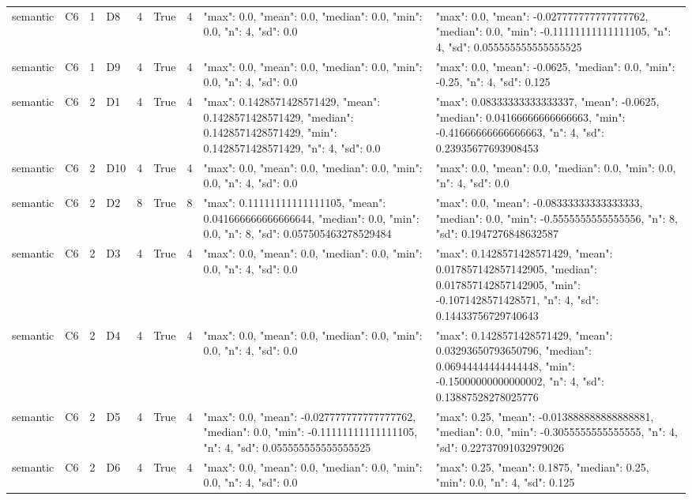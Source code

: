 \begin{tabular}{lllllllll}
semantic & C6 & 1 & D8 & 4 & True & 4 & {"max": 0.0, "mean": 0.0, "median": 0.0, "min": 0.0, "n": 4, "sd": 0.0} & {"max": 0.0, "mean": -0.027777777777777762, "median": 0.0, "min": -0.11111111111111105, "n": 4, "sd": 0.055555555555555525} \\
semantic & C6 & 1 & D9 & 4 & True & 4 & {"max": 0.0, "mean": 0.0, "median": 0.0, "min": 0.0, "n": 4, "sd": 0.0} & {"max": 0.0, "mean": -0.0625, "median": 0.0, "min": -0.25, "n": 4, "sd": 0.125} \\
semantic & C6 & 2 & D1 & 4 & True & 4 & {"max": 0.1428571428571429, "mean": 0.1428571428571429, "median": 0.1428571428571429, "min": 0.1428571428571429, "n": 4, "sd": 0.0} & {"max": 0.08333333333333337, "mean": -0.0625, "median": 0.04166666666666663, "min": -0.41666666666666663, "n": 4, "sd": 0.23935677693908453} \\
semantic & C6 & 2 & D10 & 4 & True & 4 & {"max": 0.0, "mean": 0.0, "median": 0.0, "min": 0.0, "n": 4, "sd": 0.0} & {"max": 0.0, "mean": 0.0, "median": 0.0, "min": 0.0, "n": 4, "sd": 0.0} \\
semantic & C6 & 2 & D2 & 8 & True & 8 & {"max": 0.11111111111111105, "mean": 0.041666666666666644, "median": 0.0, "min": 0.0, "n": 8, "sd": 0.057505463278529484} & {"max": 0.0, "mean": -0.08333333333333333, "median": 0.0, "min": -0.5555555555555556, "n": 8, "sd": 0.1947276848632587} \\
semantic & C6 & 2 & D3 & 4 & True & 4 & {"max": 0.0, "mean": 0.0, "median": 0.0, "min": 0.0, "n": 4, "sd": 0.0} & {"max": 0.1428571428571429, "mean": 0.017857142857142905, "median": 0.017857142857142905, "min": -0.1071428571428571, "n": 4, "sd": 0.14433756729740643} \\
semantic & C6 & 2 & D4 & 4 & True & 4 & {"max": 0.0, "mean": 0.0, "median": 0.0, "min": 0.0, "n": 4, "sd": 0.0} & {"max": 0.1428571428571429, "mean": 0.03293650793650796, "median": 0.06944444444444448, "min": -0.15000000000000002, "n": 4, "sd": 0.13887528278025776} \\
semantic & C6 & 2 & D5 & 4 & True & 4 & {"max": 0.0, "mean": -0.027777777777777762, "median": 0.0, "min": -0.11111111111111105, "n": 4, "sd": 0.055555555555555525} & {"max": 0.25, "mean": -0.013888888888888881, "median": 0.0, "min": -0.3055555555555555, "n": 4, "sd": 0.22737091032979026} \\
semantic & C6 & 2 & D6 & 4 & True & 4 & {"max": 0.0, "mean": 0.0, "median": 0.0, "min": 0.0, "n": 4, "sd": 0.0} & {"max": 0.25, "mean": 0.1875, "median": 0.25, "min": 0.0, "n": 4, "sd": 0.125} \\

\end{tabular}
